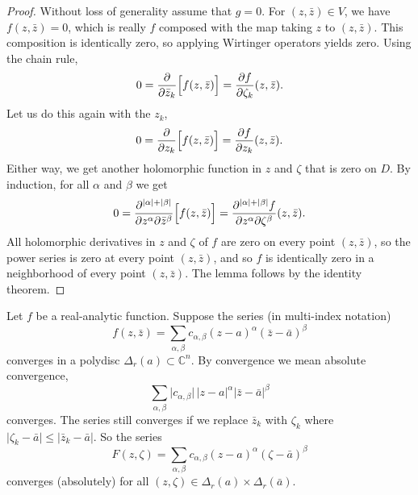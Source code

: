 \documentclass[12pt,openany]{book}
\newcommand{\sabs}[1]{\lvert {#1} \rvert}
\newcommand{\C}{{\mathbb{C}}}
\theoremstyle{plain}
\theoremstyle{remark}
\theoremstyle{definition}
\theoremstyle{exercise}
\theoremstyle{example}
\begin{document}
\begin{proof}
Without loss of generality assume that $g=0$.
For $(z,\bar{z}) \in V$, we have $f(z,\bar{z}) = 0$, which is really
$f$ composed with the map taking $z$ to $(z,\bar{z})$.  This
composition is identically zero, so applying Wirtinger operators yields zero.
Using the chain rule,
\begin{equation*}
0 =
\frac{\partial}{\partial \bar{z}_k} \Bigl[f(z,\bar{z})\Bigr]
=
\frac{\partial f}{\partial \zeta_k}(z,\bar{z}) .
\end{equation*}
Let us do this again with the $z_k$,
\begin{equation*}
0 =
\frac{\partial}{\partial z_k} \Bigl[f(z,\bar{z})\Bigr]
=
\frac{\partial f}{\partial z_k}(z,\bar{z}) .
\end{equation*}
Either way, we get another holomorphic function in $z$ and $\zeta$
that is zero on $D$.
By induction, for all $\alpha$ and $\beta$ we get
\begin{equation*}
0 =
\frac{\partial^{\sabs{\alpha}+\sabs{\beta}}}{\partial z^\alpha \partial \bar{z}^\beta} \Bigl[f(z,\bar{z})\Bigr]
=
\frac{\partial^{\sabs{\alpha}+\sabs{\beta}} f}{\partial z^\alpha \partial
\zeta^\beta}(z,\bar{z}) .
\end{equation*}
All holomorphic derivatives in $z$ and $\zeta$ of $f$ are zero on every point
$(z,\bar{z})$, so the power series is zero at every point $(z,\bar{z})$,
and so $f$ is identically zero in a neighborhood of every
point $(z,\bar{z})$.  The lemma follows by the identity
theorem.
\end{proof}

Let $f$ be a real-analytic function.  Suppose
the series (in multi-index notation)
\begin{equation*}
f(z,\bar{z}) =
\sum_{\alpha,\beta} c_{\alpha,\beta} {(z-a)}^\alpha
{(\bar{z}-\bar{a})}^\beta
\end{equation*}
converges in a polydisc $\Delta_r(a) \subset \C^n$.
By convergence we mean absolute
convergence,
\begin{equation*}
\sum_{\alpha,\beta} \sabs{c_{\alpha,\beta}} \, \sabs{z-a}^\alpha
\sabs{\bar{z}-\bar{a}}^\beta
\end{equation*}
converges.
The series still converges if we replace $\bar{z}_k$  with
$\zeta_k$ where $\sabs{\zeta_k-\bar{a}} \leq \sabs{\bar{z}_k-\bar{a}}$.
So the series
\begin{equation*}
F(z,\zeta) =
\sum_{\alpha,\beta} c_{\alpha,\beta} {(z-a)}^\alpha
{(\zeta-\bar{a})}^\beta
\end{equation*}
converges (absolutely) for all $(z,\zeta) \in \Delta_r(a) \times \Delta_r(\bar{a})$.
\end{document}
